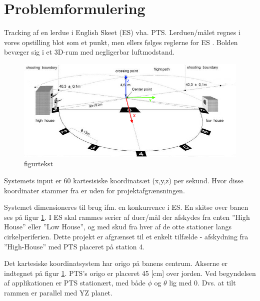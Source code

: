 \section{Problemformulering}
Tracking af en lerdue i English Skeet (ES) vha. PTS. 
Lerduen/målet regnes i vores opstilling blot som et punkt, men ellers følges reglerne for ES \citep{ES_regler}.
Bolden bevæger sig i et 3D-rum med negligerbar luftmodstand. 

\begin{figure}[th!]
\centering
\includegraphics[width=1\textwidth]{./graphics/skeet_diagram_cropped_axes}
\caption[tekst i indholdsfortegnelsen]{figurtekst}
\label{fig:ES}
\end{figure}	
Systemets input er 60 kartesisiske koordinatsæt (x,y,z) per sekund. Hvor disse 
koordinater stammer fra er uden for projektafgrænsningen. 

Systemet dimensioneres til brug ifm. en konkurrence i ES. En skitse over 
banen ses på figur \ref{fig:ES}.
I ES skal rammes serier af duer/mål der afskydes fra 
enten ”High House” eller ”Low House”, og med skud fra hver af de otte stationer langs 
cirkelperiferien. Dette projekt er afgrænset til et enkelt tilfælde - afskydning fra ”High-House” med PTS placeret på station 4. 

Det kartesiske koordinatsystem har origo på banens centrum. Akserne er indtegnet på figur \ref{fig:ES}. PTS's origo er placeret 45 [cm] over jorden. Ved begyndelsen af applikationen er PTS stationært, med både $\phi$ og $\theta$ lig med 0. Dvs. at tilt rammen er parallel med YZ planet. 




